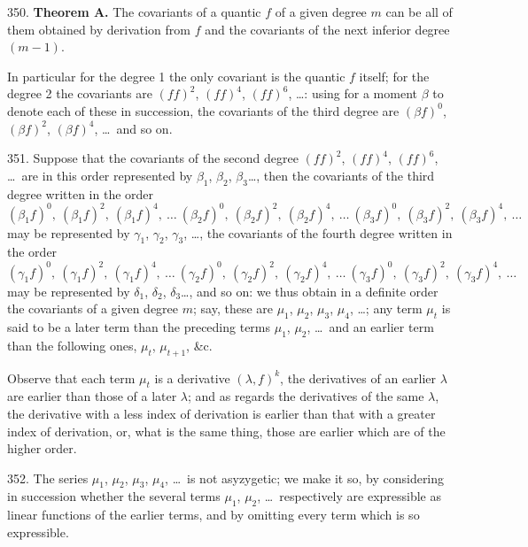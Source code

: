 \documentclass[11pt,a4paper]{article}
\begin{document}
350. \textbf{Theorem A.} The covariants of a quantic $f$ of a given degree $m$ can be all of them obtained by derivation from $f$ and the covariants of the next inferior degree $(m-1)$.

In particular for the degree 1 the only covariant is the quantic $f$ itself; for the degree 2 the covariants are $(ff)^{2}$, $(ff)^{4}$, $(ff)^{6}$, \ldots: using for a moment $\beta$ to denote each of these in succession, the covariants of the third degree are $(\beta f)^{0}$, $(\beta f)^{2}$, $(\beta f)^{4}$, \ldots\ and so on.

351. Suppose that the covariants of the second degree $(ff)^{2}$, $(ff)^{4}$, $(ff)^{6}$, \ldots\ are in this order represented by $\beta_{1}$, $\beta_{2}$, $\beta_{3}$\ldots, then the covariants of the third degree written in the order
\[
(\beta_{1}f)^{0},\ (\beta_{1}f)^{2},\ (\beta_{1}f)^{4},\ \ldots\ (\beta_{2}f)^{0},\ (\beta_{2}f)^{2},\ (\beta_{2}f)^{4},\ \ldots\ (\beta_{3}f)^{0},\ (\beta_{3}f)^{2},\ (\beta_{3}f)^{4},\ \ldots
\]
may be represented by $\gamma_{1}$, $\gamma_{2}$, $\gamma_{3}$, \ldots, the covariants of the fourth degree written in the order
\[
(\gamma_{1}f)^{0},\ (\gamma_{1}f)^{2},\ (\gamma_{1}f)^{4},\ \ldots\ (\gamma_{2}f)^{0},\ (\gamma_{2}f)^{2},\ (\gamma_{2}f)^{4},\ \ldots\ (\gamma_{3}f)^{0},\ (\gamma_{3}f)^{2},\ (\gamma_{3}f)^{4},\ \ldots
\]
may be represented by $\delta_{1}$, $\delta_{2}$, $\delta_{3}$\ldots, and so on: we thus obtain in a definite order the covariants of a given degree $m$; say, these are $\mu_{1}$, $\mu_{2}$, $\mu_{3}$, $\mu_{4}$, \ldots; any term $\mu_{t}$ is said to be a later term than the preceding terms $\mu_{1}$, $\mu_{2}$, \ldots\ and an earlier term than the following ones, $\mu_{t}$, $\mu_{t+1}$, \&c.

Observe that each term $\mu_{t}$ is a derivative $(\lambda, f)^{k}$, the derivatives of an earlier $\lambda$ are earlier than those of a later $\lambda$; and as regards the derivatives of the same $\lambda$, the derivative with a less index of derivation is earlier than that with a greater index of derivation, or, what is the same thing, those are earlier which are of the higher order.

352. The series $\mu_{1}$, $\mu_{2}$, $\mu_{3}$, $\mu_{4}$, \ldots\ is not asyzygetic; we make it so, by considering in succession whether the several terms $\mu_{1}$, $\mu_{2}$, \ldots\ respectively are expressible as linear functions of the earlier terms, and by omitting every term which is so expressible.
\end{document}
